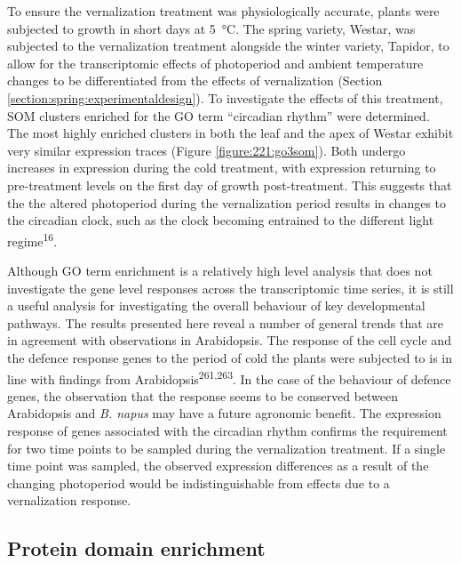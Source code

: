 \documentclass[12pt,]{book}
\begin{document}
To ensure the vernalization treatment was physiologically accurate,
plants were subjected to growth in short days at 5~°C. The spring
variety, Westar, was subjected to the vernalization treatment alongside
the winter variety, Tapidor, to allow for the transcriptomic effects of
photoperiod and ambient temperature changes to be differentiated from
the effects of vernalization (Section
\ref{section:spring:experimentaldesign}). To investigate the effects of
this treatment, SOM clusters enriched for the GO term ``circadian
rhythm'' were determined. The most highly enriched clusters in both the
leaf and the apex of Westar exhibit very similar expression traces
(Figure \ref{figure:221:go3som}). Both undergo increases in expression
during the cold treatment, with expression returning to pre-treatment
levels on the first day of growth post-treatment. This suggests that the
the altered photoperiod during the vernalization period results in
changes to the circadian clock, such as the clock becoming entrained to
the different light regime\textsuperscript{16}.

Although GO term enrichment is a relatively high level analysis that
does not investigate the gene level responses across the transcriptomic
time series, it is still a useful analysis for investigating the overall
behaviour of key developmental pathways. The results presented here
reveal a number of general trends that are in agreement with
observations in Arabidopsis. The response of the cell cycle and the
defence response genes to the period of cold the plants were subjected
to is in line with findings from Arabidopsis\textsuperscript{261,263}.
In the case of the behaviour of defence genes, the observation that the
response seems to be conserved between Arabidopsis and \emph{B. napus}
may have a future agronomic benefit. The expression response of genes
associated with the circadian rhythm confirms the requirement for two
time points to be sampled during the vernalization treatment. If a
single time point was sampled, the observed expression differences as a
result of the changing photoperiod would be indistinguishable from
effects due to a vernalization response.

\subsection{Protein domain
enrichment}\label{section:spring:proteinenrichment}
\end{document}
